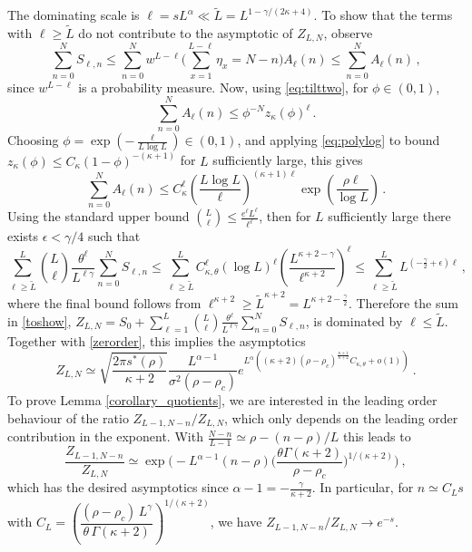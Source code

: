 \documentclass[pdflatex,sn-mathphys-num]{sn-jnl}%
\theoremstyle{thmstyleone}%
\theoremstyle{thmstyletwo}%
\theoremstyle{thmstylethree}%
\begin{document}
The dominating scale is $\ell=sL^\alpha \ll\tilde L=L^{1-\gamma /(2\kappa +4)}$. 
To show that the terms with $\ell\geq\tilde L$ do not contribute to the asymptotic of $Z_{L,N}$, observe
\[
\sum_{n=0}^N S_{\ell ,n} \leq \sum_{n=0}^N w^{L-\ell} \Big(\sum_{x=1}^{L-\ell} \eta_x =N-n\Big)A_{\ell}(n) \leq  \sum_{n=0}^N A_{\ell}(n)\,,
\]
since $w^{L-\ell}$ is a probability measure.
Now, using \eqref{eq:tilttwo}, for $\phi \in (0,1)$,
\[
\sum_{n=0}^N A_{\ell}(n) \leq \phi^{-N}z_\kappa (\phi)^\ell\,.
\]
Choosing $\phi = \exp\left(-\frac{\ell}{L\log L}\right)\in (0,1)$, and applying \eqref{eq:polylog} to bound $z_\kappa (\phi) \leq C_\kappa (1-\phi)^{-(\kappa +1)}$ for $L$ sufficiently large, this gives
\[
\sum_{n=0}^N A_{\ell}(n) \leq C_\kappa^\ell \left( \frac{L \log L}{\ell}\right)^{(\kappa+1)\ell} \exp\left(\frac{\rho \ell}{\log L}\right)\,.
\]
Using the standard upper bound $\binom{L}{\ell}\leq \frac{e^{\ell}L^{\ell}}{\ell^\ell}$, then for $L$ sufficiently large there exists $\epsilon < \gamma/4$ such that
\[
\sum_{\ell \geq \tilde{L}}^L {L\choose\ell} \frac{\theta^\ell}{L^{\ell\gamma}} \sum_{n=0}^N S_{\ell ,n} \leq \sum_{\ell \geq \tilde{L}}^LC_{\kappa,\theta}^\ell(\log L)^{\ell}\left(\frac{L^{\kappa+2-\gamma}}{\ell^{\kappa+2}}\right)^\ell\leq \sum_{\ell \geq \tilde{L}}^L L^{(-\frac{\gamma}{2}+\epsilon)\ell}\,,
\]
where the final bound follows from $\ell^{\kappa+2} \geq \tilde{L}^{\kappa+2}=L^{\kappa+2 - \frac{\gamma}{2}}$.
Therefore the sum in \eqref{toshow}, $\displaystyle Z_{L,N} =S_0 +\sum_{\ell =1}^L {L\choose\ell} \frac{\theta^\ell}{L^{\ell\gamma}} \sum_{n=0}^N S_{\ell ,n}$, is dominated by $\ell\leq\tilde L$. 
Together with \eqref{zerorder}, this implies the asymptotics
\[
Z_{L,N} \simeq \sqrt{\frac{2\pi s^* (\rho )}{\kappa +2}}\frac{L^{\alpha -1}}{\sigma^2 (\rho -\rho_c )}e^{L^\alpha ((\kappa +2) (\rho -\rho_c)^{\frac{\kappa +1}{\kappa +2}} C_{\kappa ,\theta} +o(1))}\ .
\]
To prove Lemma \ref{corollary_quotients}, we are interested in the leading order behaviour of the ratio $Z_{L-1,N-n}/Z_{L,N}$, which only depends on the leading order contribution in the exponent. With $\frac{N-n}{L-1} \simeq\rho -(n-\rho )/L$ this leads to
\[
\frac{Z_{L-1,N-n}}{Z_{L,N}} \simeq \exp\bigg( -L^{\alpha -1} (n-\rho ) \Big(\frac{\theta\Gamma (\kappa +2)}{\rho -\rho_c}\Big)^{1/(\kappa +2)} \bigg)\ ,
\]
which has the desired asymptotics since $\alpha -1=-\frac{\gamma}{\kappa +2}$. In particular, for $n\simeq C_L s$ with $C_L =\left(\dfrac{(\rho - \rho_c) \, L^\gamma}{\theta \, \Gamma(\kappa +2)}\right)^{1/(\kappa +2)}$, we have $Z_{L-1,N-n}/Z_{L,N}\to e^{-s}$.\\
\end{document}
